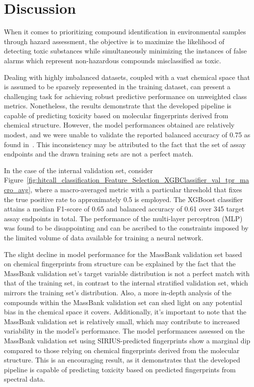 \chapter{Discussion}\label{chap:discussion}

When it comes to prioritizing compound identification in environmental samples through hazard assessment, the objective is to maximize the likelihood of detecting toxic substances while simultaneously minimizing the instances of false alarms which represent non-hazardous compounds misclassified as toxic. 

Dealing with highly imbalanced datasets, coupled with a vast chemical space that is assumed to be sparsely represented in the training dataset, can present a challenging task for achieving robust predictive performance on unweighted class metrics. Nonetheless, the results demonstrate that the developed pipeline is capable of predicting toxicity based on molecular fingerprints derived from chemical structure. However, the model performances obtained are relatively modest, and we were unable to validate the reported balanced accuracy of 0.75 as found in~\cite{arturi}. This inconsistency may be attributed to the fact that the set of assay endpoints and the drawn training sets are not a perfect match. 

In the case of the internal validation set, consider Figure~\ref{fig:hitcall_classification_Feature_Selection_XGBClassifier_val_tpr_macro_avg}, where a macro-averaged metric with a particular threshold that fixes the true positive rate to approximately 0.5 is employed. The XGBoost classifier attains a median F1-score of 0.65 and balanced accuracy of 0.61 over 345 target assay endpoints in total. The performance of the multi-layer perceptron (MLP) was found to be disappointing and can be ascribed to the constraints imposed by the limited volume of data available for training a neural network.

The slight decline in model performance for the MassBank validation set based on chemical fingerprints from structure can be explained by the fact that the MassBank validation set's target variable distribution is not a perfect match with that of the training set, in contrast to the internal stratified validation set, which mirrors the training set's distribution. Also, a more in-depth analysis of the compounds within the MassBank validation set can shed light on any potential bias  in the chemical space it covers. Additionally, it's important to note that the MassBank validation set is relatively small, which may contribute to increased variability in the model's performance. The model performances assessed on the MassBank validation set using SIRIUS-predicted fingerprints show a marginal dip compared to those relying on chemical fingerprints derived from the molecular structure. This is an encouraging result, as it demonstrates that the developed pipeline is capable of predicting toxicity based on predicted fingerprints from spectral data.

